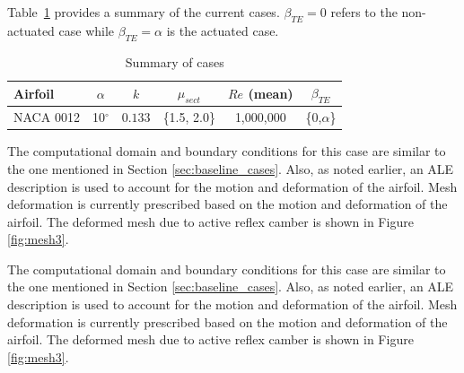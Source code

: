 Table~\ref{table:summary_cases} provides a summary of the current cases. $\beta_{TE}=0$ refers to the non-actuated case while $\beta_{TE}=\alpha$ is the actuated case.

\begin{table}[H]
	\centering
	\caption{Summary of cases}
	\label{table:summary_cases}
	\begin{tabular}{|l|c|c|c|c|c|}
		\hline
		Airfoil   & $\alpha$ & $k$ & $\mu_{sect}$ & $Re$ (mean) & $\beta_{TE}$\\
		\hline
		\hline
		NACA 0012 & 10$^\circ$ & $0.133$ & \{1.5, 2.0\} & 1,000,000 & \{0,$\alpha$\} \\
		\hline
		
	\end{tabular}
	
\end{table}

The computational domain and boundary conditions for this case are similar to the one mentioned in Section \ref{sec:baseline_cases}.
Also, as noted earlier, an ALE description is used to account for the motion and deformation of the airfoil.
Mesh deformation is currently prescribed based on the motion and deformation of the airfoil.
The deformed mesh due to active reflex camber is shown in Figure \ref{fig:mesh3}.

The computational domain and boundary conditions for this case are similar to the one mentioned in Section \ref{sec:baseline_cases}.
Also, as noted earlier, an ALE description is used to account for the motion and deformation of the airfoil.
Mesh deformation is currently prescribed based on the motion and deformation of the airfoil.
The deformed mesh due to active reflex camber is shown in Figure \ref{fig:mesh3}.


